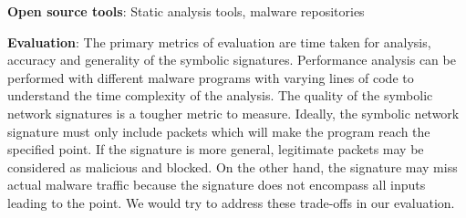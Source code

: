 \documentclass[]{article}
\begin{document}
\noindent\textbf{Open source tools}: Static analysis tools, malware repositories

\noindent\textbf{Evaluation}: 
The primary metrics of evaluation are time taken for analysis, accuracy and 
generality of the symbolic signatures. Performance analysis can be performed 
with different malware programs with varying lines of code to understand
the time complexity of the analysis. The quality of the symbolic network
signatures is a tougher metric to measure. Ideally, the symbolic network 
signature must only include packets which will make the program reach the
specified point. If the signature is more general, legitimate packets may 
be considered as malicious and blocked. On the other hand, the signature
may miss actual malware traffic because the signature does not encompass
all inputs leading to the point. We would try to address these trade-offs in
our evaluation.


\end{document}

